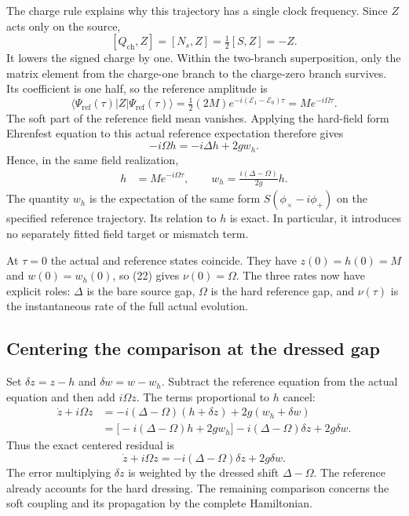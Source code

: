 \documentclass[10pt,twocolumn,letterpaper]{article}
\begin{document}
The charge rule explains why this trajectory has a single clock frequency. Since $Z$ acts only on the source,
\[
[Q_{\mathrm{ch}},Z]=[N_s,Z]=\tfrac12[S,Z]=-Z.
\]
It lowers the signed charge by one. Within the two-branch superposition, only the matrix element from the charge-one branch to the charge-zero branch survives. Its coefficient is one half, so the reference amplitude is
\[
\langle\Psi_{\mathrm{ref}}(\tau)|Z|\Psi_{\mathrm{ref}}(\tau)\rangle
=\tfrac12(2M)e^{-i(\mathcal E_1-\mathcal E_0)\tau}
=Me^{-i\Omega\tau}.
\]
The soft part of the reference field mean vanishes. Applying the hard-field form Ehrenfest equation to this actual reference expectation therefore gives
\[
-i\Omega h=-i\Delta h+2g w_h.
\]
Hence, in the same field realization,
\begin{equation}
\begin{aligned}
h&=Me^{-i\Omega\tau},\qquad
w_h=\frac{i(\Delta-\Omega)}{2g}h.
\end{aligned}\tag{24}\label{eq:clock-reference}
\end{equation}
The quantity $w_h$ is the expectation of the same form $S(\phi_\times-i\phi_+)$ on the specified reference trajectory. Its relation to $h$ is exact. In particular, it introduces no separately fitted field target or mismatch term.

At $\tau=0$ the actual and reference states coincide. They have $z(0)=h(0)=M$ and $w(0)=w_h(0)$, so (22) gives $\nu(0)=\Omega$. The three rates now have explicit roles: $\Delta$ is the bare source gap, $\Omega$ is the hard reference gap, and $\nu(\tau)$ is the instantaneous rate of the full actual evolution.

\subsection{Centering the comparison at the dressed gap}
Set $\delta z=z-h$ and $\delta w=w-w_h$. Subtract the reference equation from the actual equation and then add $i\Omega z$. The terms proportional to $h$ cancel:
\[
\begin{aligned}
\dot z+i\Omega z
&=-i(\Delta-\Omega)(h+\delta z)
   +2g(w_h+\delta w)\\
&=\bigl[-i(\Delta-\Omega)h+2gw_h\bigr]
   -i(\Delta-\Omega)\delta z+2g\delta w.
\end{aligned}
\]
Thus the exact centered residual is
\begin{equation}
\dot z+i\Omega z=-i(\Delta-\Omega)\delta z+2g\delta w.\tag{25}\label{eq:clock-centered}
\end{equation}
The error multiplying $\delta z$ is weighted by the dressed shift $\Delta-\Omega$. The reference already accounts for the hard dressing. The remaining comparison concerns the soft coupling and its propagation by the complete Hamiltonian.
\end{document}
